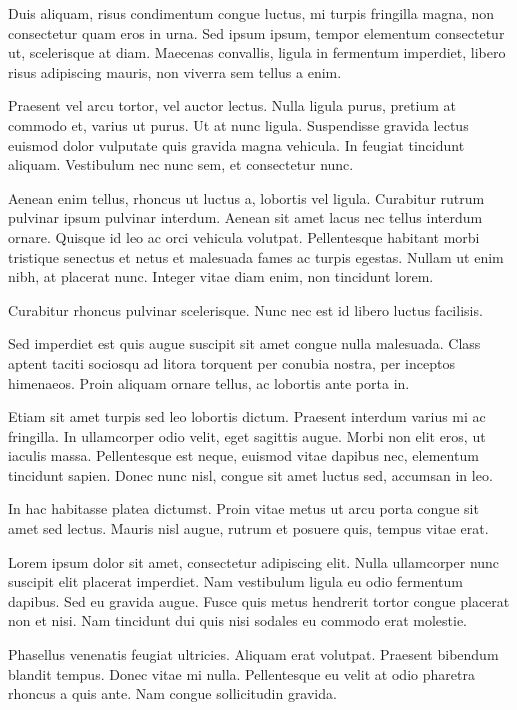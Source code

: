 \documentclass[12pt,a4paper]{report}
\begin{document}
Duis aliquam, risus condimentum congue luctus, mi turpis fringilla magna, non consectetur quam eros in urna. Sed ipsum ipsum, tempor elementum consectetur ut, scelerisque at diam. Maecenas convallis, ligula in fermentum imperdiet, libero risus adipiscing mauris, non viverra sem tellus a enim.

Praesent vel arcu tortor, vel auctor lectus. Nulla ligula purus, pretium at commodo et, varius ut purus. Ut at nunc ligula. Suspendisse gravida lectus euismod dolor vulputate quis gravida magna vehicula. In feugiat tincidunt aliquam. Vestibulum nec nunc sem, et consectetur nunc. 

Aenean enim tellus, rhoncus ut luctus a, lobortis vel ligula. Curabitur rutrum pulvinar ipsum pulvinar interdum. Aenean sit amet lacus nec tellus interdum ornare. Quisque id leo ac orci vehicula volutpat. Pellentesque habitant morbi tristique senectus et netus et malesuada fames ac turpis egestas. Nullam ut enim nibh, at placerat nunc. Integer vitae diam enim, non tincidunt lorem. 

Curabitur rhoncus pulvinar scelerisque. Nunc nec est id libero luctus facilisis.

Sed imperdiet est quis augue suscipit sit amet congue nulla malesuada. Class aptent taciti sociosqu ad litora torquent per conubia nostra, per inceptos himenaeos. Proin aliquam ornare tellus, ac lobortis ante porta in. 

Etiam sit amet turpis sed leo lobortis dictum. Praesent interdum varius mi ac fringilla. In ullamcorper odio velit, eget sagittis augue. Morbi non elit eros, ut iaculis massa. Pellentesque est neque, euismod vitae dapibus nec, elementum tincidunt sapien. Donec nunc nisl, congue sit amet luctus sed, accumsan in leo. 

In hac habitasse platea dictumst. Proin vitae metus ut arcu porta congue sit amet sed lectus. Mauris nisl augue, rutrum et posuere quis, tempus vitae erat.

Lorem ipsum dolor sit amet, consectetur adipiscing elit. Nulla ullamcorper nunc suscipit elit placerat imperdiet. Nam vestibulum ligula eu odio fermentum dapibus. Sed eu gravida augue. Fusce quis metus hendrerit tortor congue placerat non et nisi. Nam tincidunt dui quis nisi sodales eu commodo erat molestie. 

Phasellus venenatis feugiat ultricies. Aliquam erat volutpat. Praesent bibendum blandit tempus. Donec vitae mi nulla. Pellentesque eu velit at odio pharetra rhoncus a quis ante. Nam congue sollicitudin gravida. 
\end{document}
